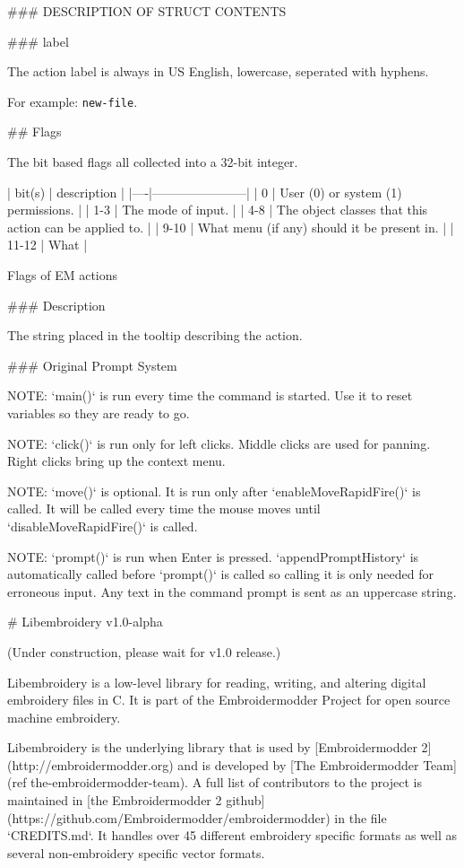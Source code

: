 ### DESCRIPTION OF STRUCT CONTENTS

### label

The action label is always in US English, lowercase,
seperated with hyphens.

For example: \texttt{new-file}.

## Flags

The bit based flags all collected into a 32-bit integer.

| bit(s) | description |
|----|-----------------------|
| 0 | User (0) or system (1) permissions. |
| 1-3 | The mode of input. |
| 4-8 | The object classes that this action can be applied to. |
| 9-10 | What menu (if any) should it be present in. |
| 11-12 | What |

\caption{Flags of EM actions}

### Description

The string placed in the tooltip describing the action.

### Original Prompt System

NOTE: `main()` is run every time the command is started.
Use it to reset variables so they are ready to go.

NOTE: `click()` is run only for left clicks.
Middle clicks are used for panning.
Right clicks bring up the context menu.

NOTE: `move()` is optional. It is run only after
`enableMoveRapidFire()` is called. It
will be called every time the mouse moves until
`disableMoveRapidFire()` is called.

NOTE: `prompt()` is run when Enter is pressed.
`appendPromptHistory` is automatically called before `prompt()`
is called so calling it is only needed for erroneous input.
Any text in the command prompt is sent as an uppercase string.

# Libembroidery v1.0-alpha

(Under construction, please wait for v1.0 release.)

Libembroidery is a low-level library for reading, writing, 
and altering digital embroidery files in C. It is part of the Embroidermodder Project
for open source machine embroidery.

Libembroidery is the underlying library that is used by [Embroidermodder 2](http://embroidermodder.org)
and is developed by [The Embroidermodder Team](ref the-embroidermodder-team).
A full list of contributors to the project is maintained in
[the Embroidermodder 2 github](https://github.com/Embroidermodder/embroidermodder)
in the file `CREDITS.md`.
It handles over 45 different embroidery specific formats as well
as several non-embroidery specific vector formats.

